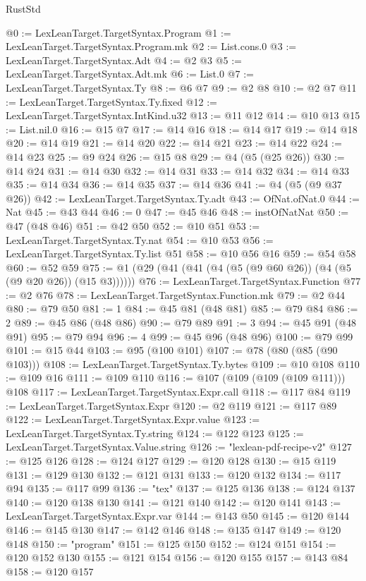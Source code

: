 \begin{lexlean}{RustStd}
\begin{coremodule}
{\begin{coremodule}
{{{{{{{{{{{{{{{{{{{{{{{{{{{{{{{{{{{{{{{{{{{{{{{{{{{{{{{{{{{{@0 := LexLeanTarget.TargetSyntax.Program
@1 := LexLeanTarget.TargetSyntax.Program.mk
@2 := List.cons.{0}
@3 := LexLeanTarget.TargetSyntax.Adt
@4 := @2 @3
@5 := LexLeanTarget.TargetSyntax.Adt.mk
@6 := List.{0}
@7 := LexLeanTarget.TargetSyntax.Ty
@8 := @6 @7
@9 := @2 @8
@10 := @2 @7
@11 := LexLeanTarget.TargetSyntax.Ty.fixed
@12 := LexLeanTarget.TargetSyntax.IntKind.u32
@13 := @11 @12
@14 := @10 @13
@15 := List.nil.{0}
@16 := @15 @7
@17 := @14 @16
@18 := @14 @17
@19 := @14 @18
@20 := @14 @19
@21 := @14 @20
@22 := @14 @21
@23 := @14 @22
@24 := @14 @23
@25 := @9 @24
@26 := @15 @8
@29 := @4 (@5 (@25 @26))
@30 := @14 @24
@31 := @14 @30
@32 := @14 @31
@33 := @14 @32
@34 := @14 @33
@35 := @14 @34
@36 := @14 @35
@37 := @14 @36
@41 := @4 (@5 (@9 @37 @26))
@42 := LexLeanTarget.TargetSyntax.Ty.adt
@43 := OfNat.ofNat.{0}
@44 := Nat
@45 := @43 @44
@46 := 0
@47 := @45 @46
@48 := instOfNatNat
@50 := @47 (@48 @46)
@51 := @42 @50
@52 := @10 @51
@53 := LexLeanTarget.TargetSyntax.Ty.nat
@54 := @10 @53
@56 := LexLeanTarget.TargetSyntax.Ty.list @51
@58 := @10 @56 @16
@59 := @54 @58
@60 := @52 @59
@75 := @1 (@29 (@41 (@41 (@4 (@5 (@9 @60 @26)) (@4 (@5 (@9 @20 @26)) (@15 @3))))))
@76 := LexLeanTarget.TargetSyntax.Function
@77 := @2 @76
@78 := LexLeanTarget.TargetSyntax.Function.mk
@79 := @2 @44
@80 := @79 @50
@81 := 1
@84 := @45 @81 (@48 @81)
@85 := @79 @84
@86 := 2
@89 := @45 @86 (@48 @86)
@90 := @79 @89
@91 := 3
@94 := @45 @91 (@48 @91)
@95 := @79 @94
@96 := 4
@99 := @45 @96 (@48 @96)
@100 := @79 @99
@101 := @15 @44
@103 := @95 (@100 @101)
@107 := @78 (@80 (@85 (@90 @103)))
@108 := LexLeanTarget.TargetSyntax.Ty.bytes
@109 := @10 @108
@110 := @109 @16
@111 := @109 @110
@116 := @107 (@109 (@109 (@109 @111))) @108
@117 := LexLeanTarget.TargetSyntax.Expr.call
@118 := @117 @84
@119 := LexLeanTarget.TargetSyntax.Expr
@120 := @2 @119
@121 := @117 @89
@122 := LexLeanTarget.TargetSyntax.Expr.value
@123 := LexLeanTarget.TargetSyntax.Ty.string
@124 := @122 @123
@125 := LexLeanTarget.TargetSyntax.Value.string
@126 := "lexlean-pdf-recipe-v2"
@127 := @125 @126
@128 := @124 @127
@129 := @120 @128
@130 := @15 @119
@131 := @129 @130
@132 := @121 @131
@133 := @120 @132
@134 := @117 @94
@135 := @117 @99
@136 := "tex"
@137 := @125 @136
@138 := @124 @137
@140 := @120 @138 @130
@141 := @121 @140
@142 := @120 @141
@143 := LexLeanTarget.TargetSyntax.Expr.var
@144 := @143 @50
@145 := @120 @144
@146 := @145 @130
@147 := @142 @146
@148 := @135 @147
@149 := @120 @148
@150 := "program"
@151 := @125 @150
@152 := @124 @151
@154 := @120 @152 @130
@155 := @121 @154
@156 := @120 @155
@157 := @143 @84
@158 := @120 @157
}}}}}}}}}}}}}}}}}}}}}}}}}}}}}}}}}}}}}}}}}}}}}}}}}}}}}}}}}}}}
\end{coremodule}}
\end{coremodule}
\end{lexlean}
